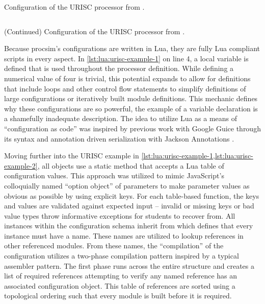 \begin{listing}[hp!]
    \inputminted[escapeinside=||, lastline=42]{lua}{./listings/urisc.lua}
    \caption{Configuration of the URISC processor from \cite{Mavaddat1988}.}
    \label{lst:lua:urisc-example-1}
\end{listing}

\begin{listing*}[hp!]
    \inputminted[escapeinside=||, firstline=45]{lua}{./listings/urisc.lua}
    \caption{(Continued) Configuration of the URISC processor from \cite{Mavaddat1988}.}
    \label{lst:lua:urisc-example-2}
\end{listing*}

Because procsim's configurations are written in Lua, they are fully Lua compliant scripts in every aspect. In \cref{lst:lua:urisc-example-1} on line 4, a local variable is defined that is used throughout the processor definition. While defining a numerical value of four is trivial, this potential expands to allow for definitions that include loops and other control flow statements to simplify definitions of large configurations or iteratively built module definitions. This mechanic defines why these configurations are so powerful, the example of a variable declaration is a shamefully inadequate description. The idea to utilize Lua as a means of ``configuration as code'' was inspired by previous work with Google Guice through its  syntax \cite{Google:Guice:Motiviation} and annotation driven serialization with Jackson Annotations \cite{Github:Jackson:Annotations}.

Moving further into the URISC example in \cref{lst:lua:urisc-example-1,lst:lua:urisc-example-2}, all objects use a static  method that accepts a Lua table of configuration values. This approach was utilized to mimic JavaScript's colloquially named ``option object'' of parameters to make parameter values as obvious as possible by using explicit keys. For each table-based function, the keys and values are validated against expected input -- invalid or missing keys or bad value types throw informative exceptions for students to recover from. All instances within the configuration schema inherit from  which defines that every instance must have a name. These names are utilized to lookup references in other referenced modules. From these names, the ``compilation'' of the configuration utilizes a two-phase compilation pattern inspired by a typical assembler pattern. The first phase runs across the entire structure and creates a list of required references attempting to verify any named reference has an associated configuration object. This table of references are sorted using a topological ordering such that every module is built before it is required. 

